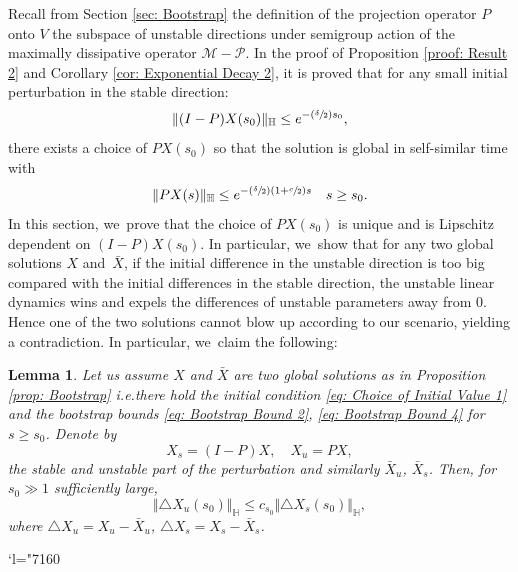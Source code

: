 \documentclass[10pt]{article}
\newcommand{\ie}{i.e.}
\newcommand{\Changel}{\mathcode`l="7160}
\newcommand{\Psfrac}[2]{(\sfrac{#1}{#2})}
\theoremstyle{plain}
\newtheorem{lemma}[proposition]{Lemma}
\theoremstyle{definition}
\begin{document}
Recall from Section \ref{sec: Bootstrap} the definition of the projection operator $P$ onto $V$ the subspace of unstable directions under semigroup action of the maximally dissipative operator $\mathcal M-\mathcal P$. In the proof of Proposition \ref{proof: Result 2} and Corollary \ref{cor: Exponential Decay 2}, it is proved that for any small initial perturbation in the stable direction:
\[
\Vert (I-P)X(s_0)\Vert_{\mathbb H}\le e^{-\Psfrac{\delta}{2}s_0},
\]
there exists a choice of $PX(s_0)$ so that the solution is global in self-similar time with
\[
\Vert PX(s)\Vert_{\mathbb H}\le e^{-\Psfrac{\delta}{2}(1+\sfrac{c}{2})s}\quad s\ge s_0.
\]
In this section, we~prove that the choice of $PX(s_0)$ is unique and is Lipschitz dependent on $(I-P)X(s_0)$. In particular, we~show that for any two global solutions $X$ and~$\bar X$, if the initial difference in the unstable direction is too big compared with the initial differences in the stable direction, the unstable linear dynamics wins and expels the differences of unstable parameters away from $0$. Hence one of the two solutions cannot blow up according to our scenario, yielding a contradiction. In particular, we~claim the following:

\begin{lemma}
\label{lem: Lipschitz}
Let us assume $X$ and $\bar X$ are two global solutions as in Proposition \ref{prop: Bootstrap} \ie there hold the initial condition \eqref{eq: Choice of Initial Value 1} and the bootstrap bounds \eqref{eq: Bootstrap Bound 2}, \eqref{eq: Bootstrap Bound 4} for $s\ge s_0$. Denote by
\[
X_s=(I-P)X,\quad X_u=PX,
\]
the stable and unstable part of the perturbation and similarly $\bar X_u$, $\bar X_s$. Then, for $s_0\gg1$ sufficiently large,
\begin{equation}
\label{eq: Lipschitz}
\Vert \triangle X_u(s_0)\Vert_{\mathbb H}\le c_{s_0} \Vert \triangle X_s(s_0)\Vert_{\mathbb H},
\end{equation}
where $\triangle X_u=X_u-\bar X_u$, $\triangle X_s=X_s-\bar X_s$.
\end{lemma}

\Changel
\end{document}
